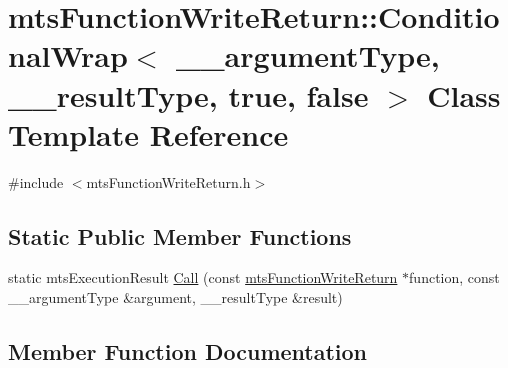 \hypertarget{classmts_function_write_return_1_1_conditional_wrap_3_01____argument_type_00_01____result_type_00_01true_00_01false_01_4}{}\section{mts\+Function\+Write\+Return\+:\+:Conditional\+Wrap$<$ \+\_\+\+\_\+argument\+Type, \+\_\+\+\_\+result\+Type, true, false $>$ Class Template Reference}
\label{classmts_function_write_return_1_1_conditional_wrap_3_01____argument_type_00_01____result_type_00_01true_00_01false_01_4}


{\ttfamily \#include $<$mts\+Function\+Write\+Return.\+h$>$}

\subsection*{Static Public Member Functions}
\begin{DoxyCompactItemize}
\item 
static mts\+Execution\+Result \hyperlink{classmts_function_write_return_1_1_conditional_wrap_3_01____argument_type_00_01____result_type_00_01true_00_01false_01_4_aa76751c394a1174d64cf4d80a58fa3eb}{Call} (const \hyperlink{classmts_function_write_return}{mts\+Function\+Write\+Return} $\ast$function, const \+\_\+\+\_\+argument\+Type \&argument, \+\_\+\+\_\+result\+Type \&result)
\end{DoxyCompactItemize}


\subsection{Member Function Documentation}
\hypertarget{classmts_function_write_return_1_1_conditional_wrap_3_01____argument_type_00_01____result_type_00_01true_00_01false_01_4_aa76751c394a1174d64cf4d80a58fa3eb}{}
